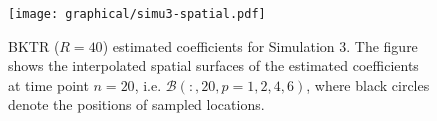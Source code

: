\documentclass[12pt]{article}
\begin{document}
\begin{figure}[!ht]
\centering
{
\texttt{[image: graphical/simu3-spatial.pdf]}
}
\caption{BKTR ($R=40$) estimated coefficients for Simulation 3. The figure shows the interpolated spatial surfaces of the estimated coefficients at time point $n=20$, i.e. $\boldsymbol{\mathcal{B}}(:,20,p=1,2,4,6)$, where black circles denote the positions of sampled locations.}
\label{fig:simu3_new_2}
\end{figure}
\end{document}

